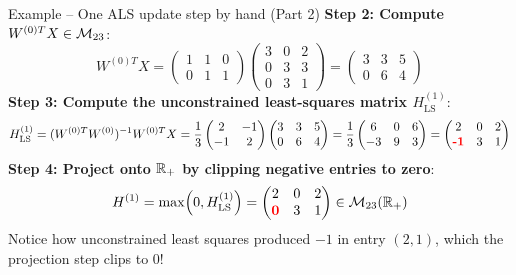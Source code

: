 \documentclass[aspectratio=169]{beamer}\usepackage[]{graphicx}\usepackage[]{xcolor}
\begin{document}
\begin{frame}{Example -- One ALS update step by hand (Part 2)}
\textbf{Step 2: Compute $W^{(0)T} X \in \mathcal{M}_{23}$}:
\[
W^{(0)T} X =
\begin{pmatrix} 1 & 1 & 0 \\ 0 & 1 & 1 \end{pmatrix}
\begin{pmatrix} 3 & 0 & 2 \\ 0 & 3 & 3 \\ 0 & 3 & 1 \end{pmatrix}
= \begin{pmatrix} 3 & 3 & 5 \\ 0 & 6 & 4 \end{pmatrix}
\]
\vfill
\textbf{Step 3: Compute the unconstrained least-squares matrix $H_{\text{LS}}^{(1)}$}:
\[
H_{\text{LS}}^{(1)} = (W^{(0)T} W^{(0)})^{-1} W^{(0)T} X
= \frac{1}{3} \begin{pmatrix} 2 & -1 \\ -1 & 2 \end{pmatrix} \begin{pmatrix} 3 & 3 & 5 \\ 0 & 6 & 4 \end{pmatrix}
= \frac{1}{3} \begin{pmatrix} 6 & 0 & 6 \\ -3 & 9 & 3 \end{pmatrix}
= \begin{pmatrix} 2 & 0 & 2 \\ {\color{red}\textbf{-1}} & 3 & 1 \end{pmatrix}
\]
\vfill
\textbf{Step 4: Project onto $\mathbb{R}_+$ by clipping negative entries to zero}:
\[
H^{(1)} = \max\!\left(0, H_{\text{LS}}^{(1)}\right) = \begin{pmatrix} 2 & 0 & 2 \\ {\color{red}\textbf{0}} & 3 & 1 \end{pmatrix} \in \mathcal{M}_{23}(\mathbb{R}_+)
\]
Notice how unconstrained least squares produced $-1$ in entry $(2,1)$, which the projection step clips to $0$!
\end{frame}
\end{document}
